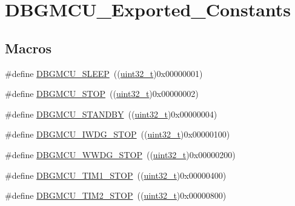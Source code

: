 \hypertarget{group___d_b_g_m_c_u___exported___constants}{}\section{D\+B\+G\+M\+C\+U\+\_\+\+Exported\+\_\+\+Constants}
\label{group___d_b_g_m_c_u___exported___constants}
\subsection*{Macros}
\begin{DoxyCompactItemize}
\item 
\#define \hyperlink{group___d_b_g_m_c_u___exported___constants_ga1c457289646b9d9814b93fbb994c9930}{D\+B\+G\+M\+C\+U\+\_\+\+S\+L\+E\+EP}~((\hyperlink{_p_e___types_8h_a33594304e786b158f3fb30289278f5af}{uint32\+\_\+t})0x00000001)
\item 
\#define \hyperlink{group___d_b_g_m_c_u___exported___constants_ga4a71bcfa6868672674b5410d2fd372f4}{D\+B\+G\+M\+C\+U\+\_\+\+S\+T\+OP}~((\hyperlink{_p_e___types_8h_a33594304e786b158f3fb30289278f5af}{uint32\+\_\+t})0x00000002)
\item 
\#define \hyperlink{group___d_b_g_m_c_u___exported___constants_ga6eb848845f9207ffdccd0590da192002}{D\+B\+G\+M\+C\+U\+\_\+\+S\+T\+A\+N\+D\+BY}~((\hyperlink{_p_e___types_8h_a33594304e786b158f3fb30289278f5af}{uint32\+\_\+t})0x00000004)
\item 
\#define \hyperlink{group___d_b_g_m_c_u___exported___constants_ga5b8b38b5589a2e26a57325553b5dfe23}{D\+B\+G\+M\+C\+U\+\_\+\+I\+W\+D\+G\+\_\+\+S\+T\+OP}~((\hyperlink{_p_e___types_8h_a33594304e786b158f3fb30289278f5af}{uint32\+\_\+t})0x00000100)
\item 
\#define \hyperlink{group___d_b_g_m_c_u___exported___constants_ga9ecfb95a943e2ad165395fff4fa12770}{D\+B\+G\+M\+C\+U\+\_\+\+W\+W\+D\+G\+\_\+\+S\+T\+OP}~((\hyperlink{_p_e___types_8h_a33594304e786b158f3fb30289278f5af}{uint32\+\_\+t})0x00000200)
\item 
\#define \hyperlink{group___d_b_g_m_c_u___exported___constants_ga017fb3101a3569426e82b066cb2f8848}{D\+B\+G\+M\+C\+U\+\_\+\+T\+I\+M1\+\_\+\+S\+T\+OP}~((\hyperlink{_p_e___types_8h_a33594304e786b158f3fb30289278f5af}{uint32\+\_\+t})0x00000400)
\item 
\#define \hyperlink{group___d_b_g_m_c_u___exported___constants_ga8ba3a77260f748793c903468a4608bd1}{D\+B\+G\+M\+C\+U\+\_\+\+T\+I\+M2\+\_\+\+S\+T\+OP}~((\hyperlink{_p_e___types_8h_a33594304e786b158f3fb30289278f5af}{uint32\+\_\+t})0x00000800)

\end{DoxyCompactItemize}
